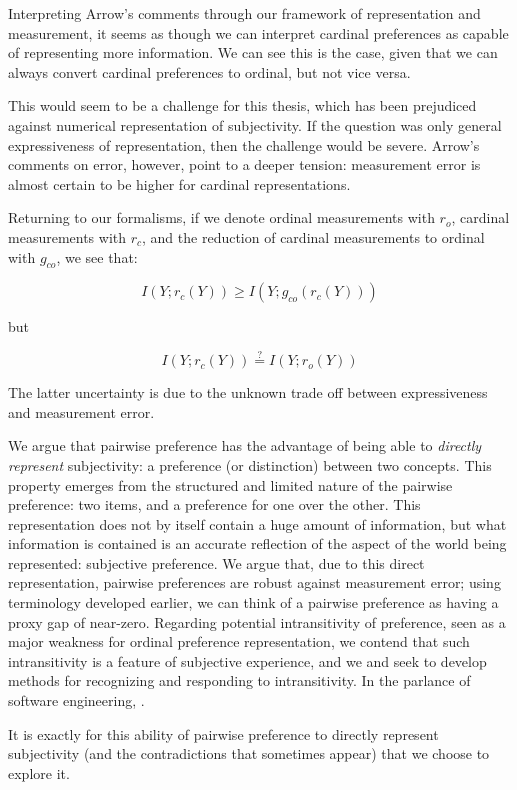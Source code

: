Interpreting Arrow's comments through our framework of representation and measurement, it seems as though we can interpret cardinal preferences as capable of representing more information.
We can see this is the case, given that we can always convert cardinal preferences to ordinal, but not vice versa.

This would seem to be a challenge for this thesis, which has been prejudiced against numerical representation of subjectivity.
If the question was only general expressiveness of representation, then the challenge would be severe.
Arrow's comments on error, however, point to a deeper tension: measurement error is almost certain to be higher for cardinal representations.

Returning to our formalisms, if we denote ordinal measurements with $r_o$, cardinal measurements with $r_c$, and the reduction of cardinal measurements to ordinal with $g_{co}$, we see that:

\[
I(Y; r_c(Y)) \geq I(Y; g_{co}(r_c(Y)))
\]

but 

\[
I(Y; r_c(Y)) \stackrel{?}{=} I(Y; r_o(Y))
\]

The latter uncertainty is due to the unknown trade off between expressiveness and measurement error.

\bigskip

We argue that pairwise preference has the advantage of being able to \textit{directly represent} subjectivity: a preference (or distinction) between two concepts.
This property emerges from the structured and limited nature of the pairwise preference: two items, and a preference for one over the other.
This representation does not by itself contain a huge amount of information, but what information is contained is an accurate reflection of the aspect of the world being represented: subjective preference.
We argue that, due to this direct representation, pairwise preferences are robust against measurement error; using terminology developed earlier, we can think of a pairwise preference as having a proxy gap of near-zero.
Regarding potential intransitivity of preference, seen as a major weakness for ordinal preference representation, we contend that such intransitivity is a feature of subjective experience, and we and seek to develop methods for recognizing and responding to intransitivity.
In the parlance of software engineering, .

It is exactly for this ability of pairwise preference to directly represent subjectivity (and the contradictions that sometimes appear) that we choose to explore it.